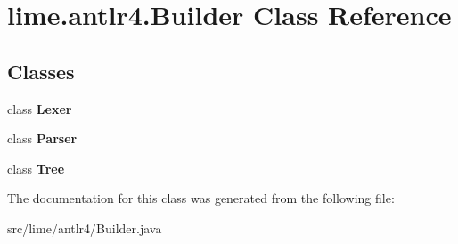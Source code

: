 \hypertarget{classlime_1_1antlr4_1_1Builder}{}\section{lime.\+antlr4.\+Builder Class Reference}
\label{classlime_1_1antlr4_1_1Builder}
\subsection*{Classes}
\begin{DoxyCompactItemize}
\item 
class {\bfseries Lexer}
\item 
class {\bfseries Parser}
\item 
class {\bfseries Tree}
\end{DoxyCompactItemize}


The documentation for this class was generated from the following file\+:\begin{DoxyCompactItemize}
\item 
src/lime/antlr4/Builder.\+java\end{DoxyCompactItemize}

